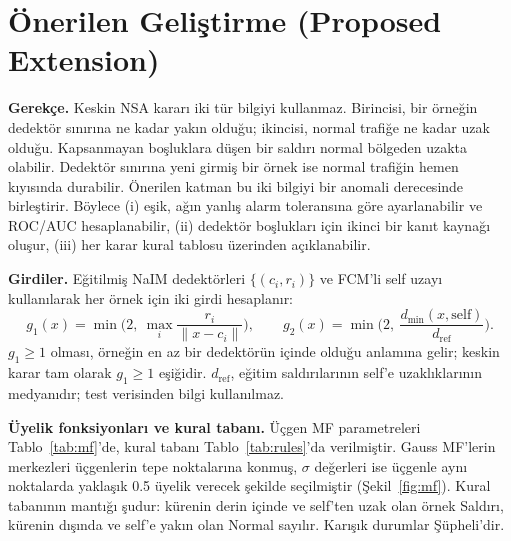 \documentclass[11pt,a4paper]{article}
\newcommand{\gbir}{g_1}
\newcommand{\giki}{g_2}
\begin{document}
\section{Önerilen Geliştirme (Proposed Extension)}

\textbf{Gerekçe.} Keskin NSA kararı iki tür bilgiyi kullanmaz. Birincisi, bir örneğin dedektör sınırına ne kadar yakın olduğu; ikincisi, normal trafiğe ne kadar uzak olduğu. Kapsanmayan boşluklara düşen bir saldırı normal bölgeden uzakta olabilir. Dedektör sınırına yeni girmiş bir örnek ise normal trafiğin hemen kıyısında durabilir. Önerilen katman bu iki bilgiyi bir anomali derecesinde birleştirir. Böylece (i) eşik, ağın yanlış alarm toleransına göre ayarlanabilir ve ROC/AUC hesaplanabilir, (ii) dedektör boşlukları için ikinci bir kanıt kaynağı oluşur, (iii) her karar kural tablosu üzerinden açıklanabilir.

\textbf{Girdiler.} Eğitilmiş NaIM dedektörleri $\{(c_i,r_i)\}$ ve FCM'li self uzayı kullanılarak her örnek için iki girdi hesaplanır:
\begin{equation}
\gbir(x)=\min\!\Big(2,\ \max_i \frac{r_i}{\lVert x-c_i\rVert}\Big),\qquad
\giki(x)=\min\!\Big(2,\ \frac{d_{\min}(x,\text{self})}{d_{\text{ref}}}\Big).
\end{equation}
$\gbir\ge1$ olması, örneğin en az bir dedektörün içinde olduğu anlamına gelir; keskin karar tam olarak $\gbir\ge1$ eşiğidir. $d_{\text{ref}}$, eğitim saldırılarının self'e uzaklıklarının medyanıdır; test verisinden bilgi kullanılmaz.

\textbf{Üyelik fonksiyonları ve kural tabanı.} Üçgen MF parametreleri Tablo~\ref{tab:mf}'de, kural tabanı Tablo~\ref{tab:rules}'da verilmiştir. Gauss MF'lerin merkezleri üçgenlerin tepe noktalarına konmuş, $\sigma$ değerleri ise üçgenle aynı noktalarda yaklaşık 0.5 üyelik verecek şekilde seçilmiştir (Şekil~\ref{fig:mf}). Kural tabanının mantığı şudur: kürenin derin içinde ve self'ten uzak olan örnek Saldırı, kürenin dışında ve self'e yakın olan Normal sayılır. Karışık durumlar Şüpheli'dir.
\end{document}

